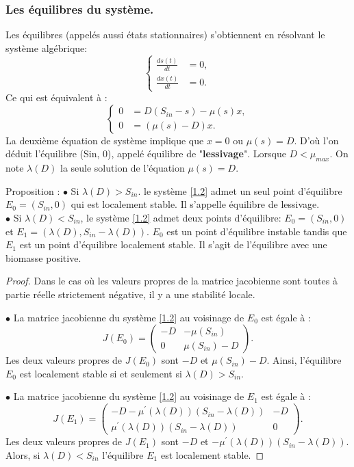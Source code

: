 \documentclass[12pt,a4paper]{report}%
\newcounter{proposition}[section] %
\newenvironment{Proposition}[2][]
  {\refstepcounter{proposition}%
  \begin{bclogo}[
    logo=\bcplume,
    couleur=aliceblue,
    arrondi=0.1,
    barre = snake ,
    couleurBord=white,#1]{Proposition \theproposition: #2}
  }
  {\end{bclogo}}
\newcounter{Prop}[section] %
\begin{document}
\subsubsection{Les équilibres du système.}
Les équilibres (appelés aussi états stationnaires) s'obtiennent en résolvant le système algébrique:
\begin{equation}
	\left\{\begin{aligned}
		\frac{ds(t)}{d t} & =0 ,\\
		\frac{dx(t)}{d t} & =0.
	\end{aligned}\right.
\end{equation}
Ce qui est équivalent à :
\begin{equation}
\left\{\begin{aligned}
0 & =D \left(S_{in}-s\right) - \mu(s)x, \\
0 & =(\mu(s)-D) x .
\end{aligned}\right.
\end{equation}
La deuxième équation de système implique que $x=0$ ou $\mu(s)=D$. D'où l'on déduit l'équilibre (Sin, 0), appelé équilibre de "{\bf lessivage}". Lorsque $D <\mu_{max}$. On note $\lambda(D)$ la seule solution de l'équation $\mu(s)=D$.
\begin{Proposition}{}\label{Mond}
$\bullet$ Si $\lambda(D)>S_{in}$. le système \eqref{1.2} admet un seul point d'équilibre $E_0=(S_{in}, 0)$ qui est localement stable. Il s'appelle équilibre de lessivage.\\
$\bullet$ Si $\lambda(D) < S_{in}$, le système \eqref{1.2} admet deux points d'équilibre: $E_0 = (S_{in}, 0)$ et $E_1 = (\lambda(D), S_{in} - \lambda(D))$. $E_0$ est un point d'équilibre instable tandis que $E_1$ est un point d'équilibre localement stable. Il s'agit de l'équilibre avec une biomasse positive.
\end{Proposition}
\begin{proof}
Dans le cas où les valeurs propres de la matrice jacobienne sont toutes à partie réelle strictement négative, il y a une stabilité locale.

$\bullet$ La matrice jacobienne du système \eqref{1.2} au voisinage de $E_0$ est égale à :
\[
J(E_0)=\begin{pmatrix}
-D & -\mu(S_{in}) \\
0 & \mu(S_{in})-D
\end{pmatrix}.
\]
Les deux valeurs propres de $J(E_0)$ sont $- D$ et $\mu(S_{in})- D$. Ainsi, l'équilibre $E_0$ est localement stable si et seulement si $\lambda(D)> S_{in}$.

$\bullet$ La matrice jacobienne du système \eqref{1.2} au voisinage de $E_1$ est égale à :
\[
J(E_1)=\begin{pmatrix}
-D -\mu^{\prime}(\lambda(D))(S_{in}-\lambda(D)) & -D \\
\mu^{\prime}(\lambda(D))(S_{in}-\lambda(D)) & 0
\end{pmatrix}.
\]
Les deux valeurs propres de $J(E_1)$ sont $- D$ et $-\mu^{\prime}(\lambda(D))(S_{in}-\lambda(D))$. Alors, si $\lambda(D)<S_{in}$ l'équilibre $E_1$ est localement stable.
\end{proof}
\end{document}
